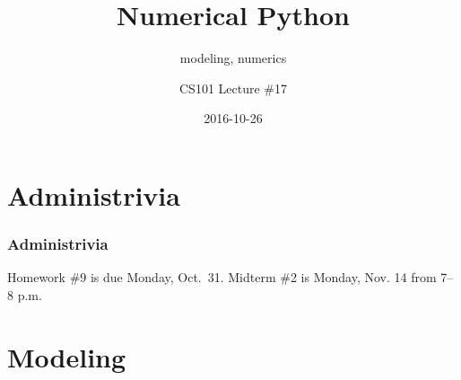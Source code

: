 \documentclass[11pt]{beamer}
\title{Numerical Python}
\subtitle{modeling, numerics}
\author{CS101 Lecture \#17}
\date{2016-10-26}
\begin{document}
  \setcounter{showProgressBar}{0}
  \setcounter{showSlideNumbers}{0}

\frame{\titlepage}

\setcounter{framenumber}{0}
\setcounter{showProgressBar}{1}
\setcounter{showSlideNumbers}{1}

\section{Administrivia}

\begin{frame}
  \frametitle{Administrivia}
  \Enlarge

  \begin{itemize}
  \myitem  Homework \#9 is due Monday, Oct.\ 31.
  \myitem  Midterm \#2 is Monday, Nov. 14 from 7–8 p.m.
  \end{itemize}
\end{frame}

\section{Modeling}
\end{document}
